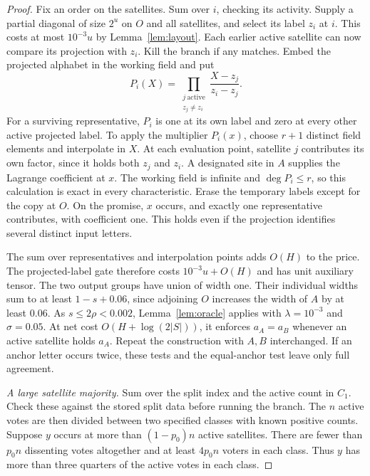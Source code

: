 \begin{proof}
Fix an order on the satellites. Sum over \(i\), checking its activity.
Supply a partial diagonal of size \(2^u\) on \(O\) and all satellites,
and select its label \(z_i\) at \(i\). This costs at most \(10^{-3}u\)
by Lemma~\ref{lem:layout}. Each earlier active satellite can now
compare its projection with \(z_i\). Kill the branch if any matches.
Embed the projected alphabet in the working field and put
\[
        P_i(X)=
        \prod_{\substack{j\ \mathrm{active}\\z_j\ne z_i}}
                         \frac{X-z_j}{z_i-z_j}.
\]
For a surviving representative, \(P_i\) is one at its own label and
zero at every other active projected label. To apply the multiplier
\(P_i(x)\), choose \(r+1\) distinct field elements and interpolate in
\(X\). At each evaluation point, satellite \(j\) contributes its own
factor, since it holds both \(z_j\) and \(z_i\). A designated site in
\(A\) supplies the Lagrange coefficient at \(x\). The working field
is infinite and \(\deg P_i\le r\), so this calculation is exact in
every characteristic. Erase the temporary labels except for the copy
at \(O\). On the promise, \(x\) occurs, and exactly one representative
contributes, with coefficient one. This holds even if the projection
identifies several distinct input letters.

The sum over representatives and interpolation points adds \(O(H)\)
to the price. The projected-label gate therefore costs
\(10^{-3}u+O(H)\) and has unit auxiliary tensor. The two output
groups have union of width one. Their individual widths sum to at
least \(1-s+0.06\), since adjoining \(O\) increases the width of \(A\)
by at least \(0.06\). As \(s\le2\rho<0.002\), Lemma~\ref{lem:oracle}
applies with \(\lambda=10^{-3}\) and \(\sigma=0.05\). At net cost
\(O(H+\log(2|S|))\), it enforces \(a_A=a_B\) whenever an active
satellite holds \(a_A\). Repeat the construction with \(A,B\)
interchanged. If an anchor letter occurs twice, these tests and the
equal-anchor test leave only full agreement.

\emph{A large satellite majority.}
Sum over the split index and the active count in \(C_1\). Check these
against the stored split data before running the branch. The \(n\)
active votes are then divided between two specified classes with
known positive counts. Suppose \(y\) occurs at more than
\((1-p_0)n\) active satellites. There are fewer than \(p_0n\)
dissenting votes altogether and at least \(4p_0n\) voters in each
class. Thus \(y\) has more than three quarters of the active votes
in each class.


\end{proof}
